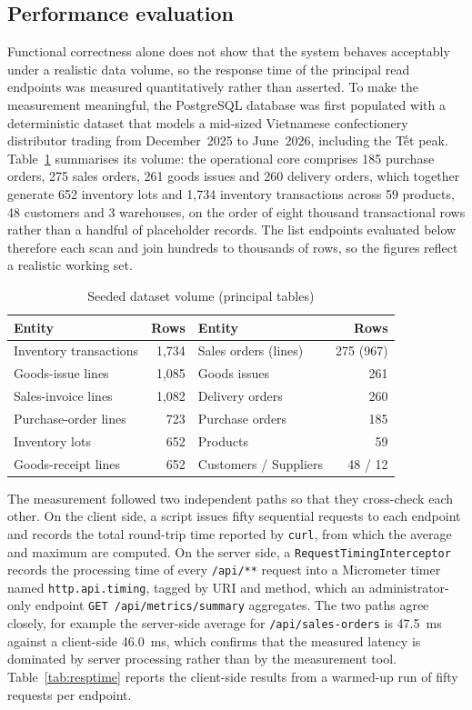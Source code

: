 \subsection{Performance evaluation}
\label{sec:perf}
Functional correctness alone does not show that the system behaves acceptably
under a realistic data volume, so the response time of the principal read
endpoints was measured quantitatively rather than asserted. To make the
measurement meaningful, the PostgreSQL database was first populated with a
deterministic dataset that models a mid-sized Vietnamese confectionery
distributor trading from December~2025 to June~2026, including the Tết peak.
Table~\ref{tab:dataset} summarises its volume: the operational core comprises
185 purchase orders, 275 sales orders, 261 goods issues and 260 delivery orders,
which together generate 652 inventory lots and 1{,}734 inventory transactions
across 59 products, 48 customers and 3 warehouses, on the order of eight thousand
transactional rows rather than a handful of placeholder records. The list
endpoints evaluated below therefore each scan and join hundreds to thousands of
rows, so the figures reflect a realistic working set.

\begin{table}[H]\centering
\caption{Seeded dataset volume (principal tables)}
\label{tab:dataset}
\begin{tabular}{|l|r|l|r|}
\hline
\textbf{Entity} & \textbf{Rows} & \textbf{Entity} & \textbf{Rows} \\ \hline
Inventory transactions & 1{,}734 & Sales orders (lines)  & 275 (967) \\ \hline
Goods-issue lines      & 1{,}085 & Goods issues          & 261 \\ \hline
Sales-invoice lines    & 1{,}082 & Delivery orders       & 260 \\ \hline
Purchase-order lines   & 723     & Purchase orders       & 185 \\ \hline
Inventory lots         & 652     & Products              & 59 \\ \hline
Goods-receipt lines    & 652     & Customers / Suppliers & 48 / 12 \\ \hline
\end{tabular}
\end{table}

The measurement followed two independent paths so that they cross-check each
other. On the client side, a script issues fifty sequential requests to each
endpoint and records the total round-trip time reported by \texttt{curl}, from
which the average and maximum are computed. On the server side, a
\texttt{RequestTimingInterceptor} records the processing time of every
\texttt{/api/**} request into a Micrometer timer named \texttt{http.api.timing},
tagged by URI and method, which an administrator-only endpoint
\texttt{GET /api/metrics/summary} aggregates. The two paths agree closely, for
example the server-side average for \texttt{/api/sales-orders} is 47.5~ms against
a client-side 46.0~ms, which confirms that the measured latency is dominated by
server processing rather than by the measurement tool.
Table~\ref{tab:resptime} reports the client-side results from a warmed-up run of
fifty requests per endpoint.

